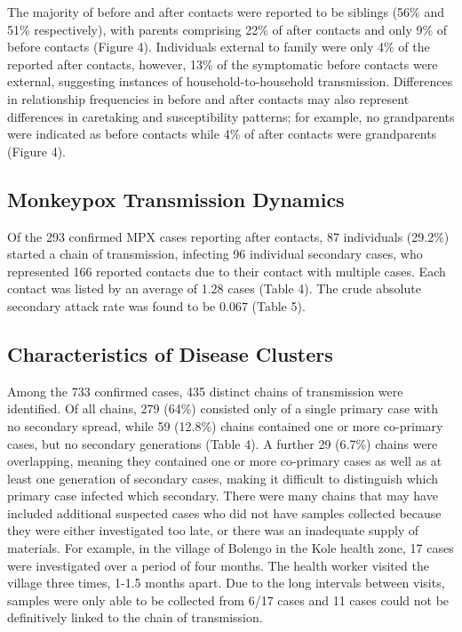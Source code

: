 The majority of before and after contacts were reported to be siblings (56\% and 51\% respectively), with parents comprising 22\% of after contacts and only 9\% of before
contacts (Figure 4). Individuals external to family were only 4\% of the reported after contacts, however, 13\% of the symptomatic before contacts were external, suggesting instances of household-to-household transmission. Differences in relationship frequencies in before and after contacts may also represent differences in caretaking and susceptibility patterns; for example, no grandparents were indicated as before contacts while 4\% of after contacts were grandparents (Figure 4).

\subsection{Monkeypox Transmission Dynamics}
Of the 293 confirmed MPX cases reporting after contacts, 87 individuals (29.2\%) started a chain of transmission, infecting 96 individual secondary cases, who represented 166 reported contacts due to their contact with multiple cases. Each contact was listed by an average of 1.28 cases (Table 4). The crude absolute secondary attack rate was found to be 0.067 (Table 5).

\subsection{Characteristics of Disease Clusters}
Among the 733 confirmed cases, 435 distinct chains of transmission were identified. Of all chains, 279 (64\%) consisted only of a single primary case with no secondary spread, while 59 (12.8\%) chains contained one or more co-primary cases, but no secondary generations (Table 4). A further 29 (6.7\%) chains were overlapping, meaning they contained one or more co-primary cases as well as at least one generation of secondary cases, making it difficult to distinguish which primary case infected which secondary. There were many chains that may have included additional suspected cases who did not have samples collected because they were either investigated too late, or there was an inadequate supply of materials. For example, in the village of Bolengo in the Kole health zone, 17 cases were investigated over a period of four months. The health worker visited the village three times, 1-1.5 months apart. Due to the long intervals between visits, samples were only able to be collected from 6/17 cases and 11 cases could not be definitively linked to the chain of transmission.

